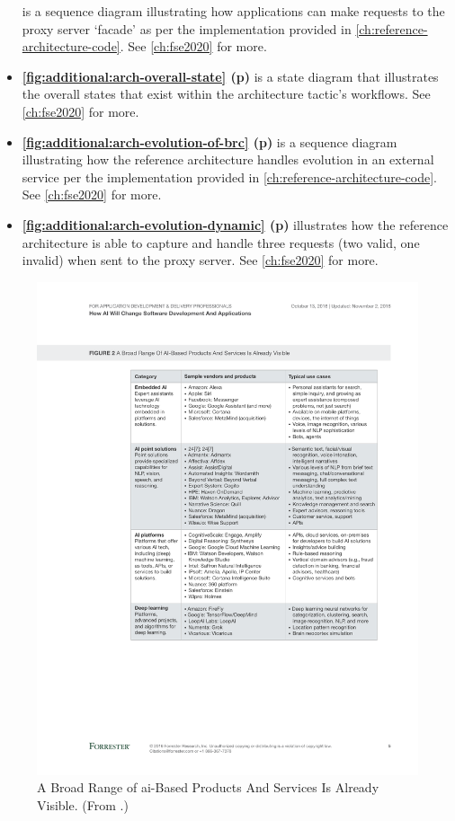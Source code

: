 \begin{itemize}
  is a sequence diagram illustrating how applications can make requests to the proxy server `facade' as per the implementation provided in \cref{ch:reference-architecture-code}. See \cref{ch:fse2020} for more.
\item \textbf{\cref{fig:additional:arch-overall-state} (p\pageref{fig:additional:arch-overall-state})}
  is a state diagram that illustrates the overall states that exist within the architecture tactic's workflows. See \cref{ch:fse2020} for more.
\item \textbf{\cref{fig:additional:arch-evolution-of-brc} (p\pageref{fig:additional:arch-evolution-of-brc})}
  is a sequence diagram illustrating how the reference architecture handles evolution in an external service per the implementation provided in \cref{ch:reference-architecture-code}. See \cref{ch:fse2020} for more.
\item \textbf{\cref{fig:additional:arch-evolution-dynamic} (p\pageref{fig:additional:arch-evolution-dynamic})}
  illustrates how the reference architecture is able to capture and handle three requests (two valid, one invalid) when sent to the proxy server. See \cref{ch:fse2020} for more.
\end{itemize}

\begin{figure}[p!]
\centering
\caption[Categorisation of AI-based products and services]{A Broad Range of \gls{ai}-Based Products And Services Is Already Visible. (From \citep{LoGiudice:2016wf}.)}
\label{fig:introduction:ai-products}
\includegraphics[width=\linewidth]{mainmatter/introduction/figures/ai-products}
\end{figure}

